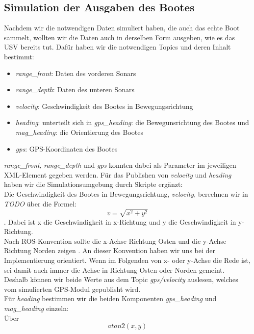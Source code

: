 \documentclass[conference]{IEEEtran}
\begin{document}
\subsection{Simulation der Ausgaben des Bootes}
Nachdem wir die notwendigen Daten simuliert haben, die auch das echte Boot sammelt, wollten wir die Daten auch in derselben Form ausgeben, wie es das USV bereits tut. Dafür haben wir die notwendigen Topics und deren Inhalt bestimmt:
\begin{itemize}
	\item \textit{range\_front}: Daten des vorderen Sonars
	\item \textit{range\_depth}: Daten des unteren Sonars
	\item \textit{velocity}: Geschwindigkeit des Bootes in Bewegungsrichtung
	\item \textit{heading}: unterteilt sich in \textit{gps\_heading}: die Bewegunsrichtung des Bootes und \textit{mag\_heading}: die Orientierung des Bootes
	\item \textit{gps}: GPS-Koordinaten des Bootes
\end{itemize}
\textit{range\_front}, \textit{range\_depth} und \textit{gps} konnten dabei als Parameter im jeweiligen XML-Element gegeben werden. Für das Publishen von \textit{velocity} und \textit{heading} haben wir die Simulationsumgebung durch Skripte ergänzt:\\
Die Geschwindigkeit des Bootes in Bewegungsrichtung, \textit{velocity}, berechnen wir in \textit{TODO} über die Formel:
\begin{equation}
v = \sqrt{x^2+y^2}
\end{equation}
. Dabei ist x die Geschwindigkeit in x-Richtung und y die Geschwindigkeit in y-Richtung.\\
Nach ROS-Konvention sollte die x-Achse Richtung Osten und die y-Achse Richtung Norden zeigen \cite{b11}. An dieser Konvention haben wir uns bei der Implementierung orientiert. Wenn im Folgenden von x- oder y-Achse die Rede ist, sei damit auch immer die Achse in Richtung Osten oder Norden gemeint.\\
Deshalb können wir beide Werte aus dem Topic \textit{gps/velocity} auslesen, welches vom simulierten GPS-Modul gepublisht wird.\\
Für \textit{heading} bestimmen wir die beiden Komponenten \textit{gps\_heading} und \textit{mag\_heading} einzeln:\\
Über 
\begin{equation}
	atan2(x,y) 	
\end{equation}
\end{document}
